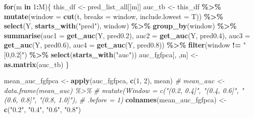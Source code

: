 \documentclass[
]{article}
\newenvironment{Shaded}{\begin{snugshade}}{\end{snugshade}}
\newcommand{\AttributeTok}[1]{\textcolor[rgb]{0.13,0.29,0.53}{#1}}
\newcommand{\CommentTok}[1]{\textcolor[rgb]{0.56,0.35,0.01}{\textit{#1}}}
\newcommand{\ControlFlowTok}[1]{\textcolor[rgb]{0.13,0.29,0.53}{\textbf{#1}}}
\newcommand{\DecValTok}[1]{\textcolor[rgb]{0.00,0.00,0.81}{#1}}
\newcommand{\FloatTok}[1]{\textcolor[rgb]{0.00,0.00,0.81}{#1}}
\newcommand{\FunctionTok}[1]{\textcolor[rgb]{0.13,0.29,0.53}{\textbf{#1}}}
\newcommand{\NormalTok}[1]{#1}
\newcommand{\OtherTok}[1]{\textcolor[rgb]{0.56,0.35,0.01}{#1}}
\newcommand{\SpecialCharTok}[1]{\textcolor[rgb]{0.81,0.36,0.00}{\textbf{#1}}}
\newcommand{\StringTok}[1]{\textcolor[rgb]{0.31,0.60,0.02}{#1}}
\begin{document}
\begin{Shaded}
\begin{Highlighting}[]
\ControlFlowTok{for}\NormalTok{(m }\ControlFlowTok{in} \DecValTok{1}\SpecialCharTok{:}\NormalTok{M)\{}
\NormalTok{  this\_df }\OtherTok{\textless{}{-}}\NormalTok{ pred\_list\_all[[m]]}
\NormalTok{  auc\_tb }\OtherTok{\textless{}{-}}\NormalTok{ this\_df }\SpecialCharTok{\%\textgreater{}\%} 
    \FunctionTok{mutate}\NormalTok{(}\AttributeTok{window =} \FunctionTok{cut}\NormalTok{(t, }\AttributeTok{breaks =}\NormalTok{ window, }\AttributeTok{include.lowest =}\NormalTok{ T)) }\SpecialCharTok{\%\textgreater{}\%} 
    \FunctionTok{select}\NormalTok{(Y, }\FunctionTok{starts\_with}\NormalTok{(}\StringTok{"pred"}\NormalTok{), window) }\SpecialCharTok{\%\textgreater{}\%}
    \FunctionTok{group\_by}\NormalTok{(window) }\SpecialCharTok{\%\textgreater{}\%}
    \FunctionTok{summarise}\NormalTok{(}\AttributeTok{auc1 =} \FunctionTok{get\_auc}\NormalTok{(Y, pred0}\FloatTok{.2}\NormalTok{),}
              \AttributeTok{auc2 =} \FunctionTok{get\_auc}\NormalTok{(Y, pred0}\FloatTok{.4}\NormalTok{),}
              \AttributeTok{auc3 =} \FunctionTok{get\_auc}\NormalTok{(Y, pred0}\FloatTok{.6}\NormalTok{),}
              \AttributeTok{auc4 =} \FunctionTok{get\_auc}\NormalTok{(Y, pred0}\FloatTok{.8}\NormalTok{)) }\SpecialCharTok{\%\textgreater{}\%}
    \FunctionTok{filter}\NormalTok{(window }\SpecialCharTok{!=} \StringTok{"[0,0.2]"}\NormalTok{) }\SpecialCharTok{\%\textgreater{}\%} 
    \FunctionTok{select}\NormalTok{(}\FunctionTok{starts\_with}\NormalTok{(}\StringTok{"auc"}\NormalTok{))}
\NormalTok{  auc\_fgfpca[, ,m] }\OtherTok{\textless{}{-}} \FunctionTok{as.matrix}\NormalTok{(auc\_tb)}
\NormalTok{\}}


\NormalTok{mean\_auc\_fgfpca }\OtherTok{\textless{}{-}} \FunctionTok{apply}\NormalTok{(auc\_fgfpca, }\FunctionTok{c}\NormalTok{(}\DecValTok{1}\NormalTok{, }\DecValTok{2}\NormalTok{), mean)}
\CommentTok{\# mean\_auc \textless{}{-} data.frame(mean\_auc) \%\textgreater{}\% }
\CommentTok{\#   mutate(Window = c("(0.2, 0.4]", "(0.4, 0.6]", "(0.6, 0.8]", "(0.8, 1.0]"),}
\CommentTok{\#          .before = 1)}
\FunctionTok{colnames}\NormalTok{(mean\_auc\_fgfpca) }\OtherTok{\textless{}{-}} \FunctionTok{c}\NormalTok{(}\StringTok{"0.2"}\NormalTok{, }\StringTok{"0.4"}\NormalTok{, }\StringTok{"0.6"}\NormalTok{, }\StringTok{"0.8"}\NormalTok{)}
\end{Highlighting}
\end{Shaded}
\end{document}
